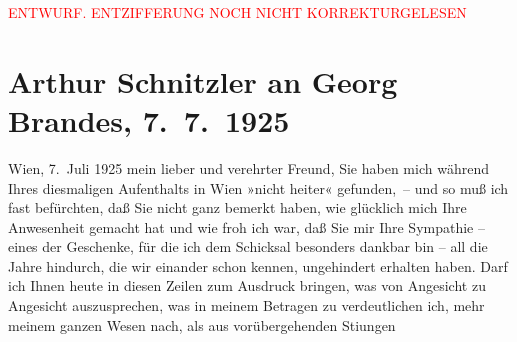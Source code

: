 
\begin{center}
            \textcolor{red}{ENTWURF. ENTZIFFERUNG NOCH NICHT KORREKTURGELESEN}
                      \end{center}
            
               \section[Arthur Schnitzler an Georg Brandes, 7. 7. 1925]{ Arthur Schnitzler an Georg Brandes, 7. 7. 1925}\nopagebreak{}\rehead{ }\begin{ledgroupsized}[t]{13cm}\normalsize\beginnumbering{} \toendnotes[C]{\smallbreak\pagebreak[2]} 
\toendnotes[C]{\smallbreak}\pstart
           \raggedleft{}{\pb}Wien, 7. Juli 1925\pend
           \pstart
           mein lieber und verehrter Freund, Sie haben mich während Ihres
               diesmaligen Aufenthalts in Wien »nicht heiter«
               gefunden, – und so muß ich fast befürchten, daß Sie nicht ganz bemerkt haben, wie
               glücklich mich Ihre Anwesenheit gemacht hat und wie froh ich war, daß Sie mir Ihre
               Sympathie – eines der Geschenke, für die ich dem Schicksal besonders dankbar bin –
               all die Jahre hindurch, die wir einander schon kennen, ungehindert erhalten haben.
               Darf ich Ihnen heute in diesen Zeilen zum Ausdruck bringen, was von Angesicht zu
               Angesicht auszusprechen, was in meinem Betragen zu verdeutlichen ich, mehr meinem
               ganzen Wesen nach, als aus vorübergehenden Sti{\geminationm}ungen

\end{ledgroupsized}
